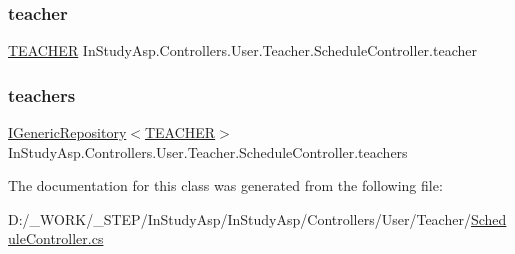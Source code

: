 \subsubsection{\texorpdfstring{teacher}{teacher}}
{\footnotesize\ttfamily \hyperlink{class_e_f_oracle_1_1_model_1_1_t_e_a_c_h_e_r}{T\+E\+A\+C\+H\+ER} In\+Study\+Asp.\+Controllers.\+User.\+Teacher.\+Schedule\+Controller.\+teacher\hspace{0.3cm}{\ttfamily [private]}}

\mbox{\label{class_in_study_asp_1_1_controllers_1_1_user_1_1_teacher_1_1_schedule_controller_a74c7bae1cf29eef4b2c4b10b919f7f3f}} 
\subsubsection{\texorpdfstring{teachers}{teachers}}
{\footnotesize\ttfamily \hyperlink{interface_repo_1_1_common_1_1_i_generic_repository}{I\+Generic\+Repository}$<$\hyperlink{class_e_f_oracle_1_1_model_1_1_t_e_a_c_h_e_r}{T\+E\+A\+C\+H\+ER}$>$ In\+Study\+Asp.\+Controllers.\+User.\+Teacher.\+Schedule\+Controller.\+teachers\hspace{0.3cm}{\ttfamily [private]}}



The documentation for this class was generated from the following file\+:\begin{DoxyCompactItemize}
\item 
D\+:/\+\_\+\+W\+O\+R\+K/\+\_\+\+S\+T\+E\+P/\+In\+Study\+Asp/\+In\+Study\+Asp/\+Controllers/\+User/\+Teacher/\hyperlink{_schedule_controller_8cs}{Schedule\+Controller.\+cs}\end{DoxyCompactItemize}
